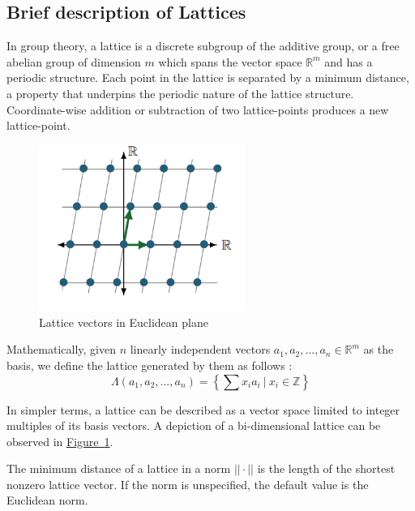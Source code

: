 \documentclass[11pt,
  titlepage=false,
  abstract=on,
]{scrreprt}
\begin{document}
\subsection{Brief description of Lattices}
In group theory, a lattice is a discrete subgroup of the additive group, or a free abelian group of dimension $m$ which spans the vector space $\mathbb{R}^m$ and has a periodic structure. 
Each point in the lattice is separated by a minimum distance, a property that underpins the periodic nature of the lattice structure. Coordinate-wise addition or subtraction of two lattice-points 
produces a new lattice-point.


\begin{figure}[h]
  \centering
  \includegraphics[width=0.6\textwidth]{figures/lattice-with-lattice-vectors.png}
  \caption{Lattice vectors in Euclidean plane \cite{latticesInPQC}}
  \label{fig:LatticeWithLatticeVectors}
\end{figure}


Mathematically, given $n$ linearly independent vectors $a_1, a_2,..., a_n \in \mathbb{R}^m$ as the basis, we define the lattice generated by them as follows \cite{latticesIntro2004}:
\begin{equation*}
  \Lambda(a_1, a_2,..., a_n) = \left\{\sum x_ia_i\ |\ x_i \in \mathbb{Z}\right\} 
\end{equation*}

In simpler terms, a lattice can be described as a vector space limited to integer multiples of its basis vectors.  A depiction of a bi-dimensional lattice can be observed in 
\hyperref[fig:LatticeWithLatticeVectors]{Figure~\ref{fig:LatticeWithLatticeVectors}}.

The minimum distance of a lattice in a norm $||\cdot||$ is the length of the shortest nonzero lattice vector. If the norm is unspecified, the default
value is the Euclidean norm.
\end{document}
